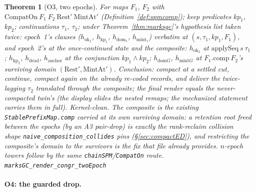 \documentclass[11pt]{article}
\newtheorem{theorem}{Theorem}[section]
\newcommand{\lean}[1]{\texttt{#1}}
\begin{document}
\begin{theorem}[O3, two epochs]
\label{thm:marksgc2}
For maps $F_1$, $F_2$ with $\mathrm{CompatOn}\ F_1\ F_2\
\mathrm{Rest}'\ \mathrm{MintAt}'$ (Definition~\ref{def:spmcomp});
keep predicates $\mathit{kp}_1$, $\mathit{kp}_2$; continuations
$\tau_1$, $\tau_2$; under Theorem~\ref{thm:marksgc}'s hypothesis
list taken twice: epoch~1's clauses ($h_{\mathrm{ok}_1}$,
$h_{\mathrm{kp}_1}$, $h_{\mathrm{dom}_1}$, $h_{\mathrm{mint}_1}$)
verbatim at $(s, \tau_1, \mathit{kp}_1, F_1)$, and epoch~2's at the
once-continued state and the \emph{composite}: $h_{\mathrm{ok}_2}$
at $\mathrm{applySeq}\ s\ \tau_1$; $h_{\mathrm{kp}_2}$,
$h_{\mathrm{dead}}$, $h_{\mathrm{anchor}}$ at the conjunction
$\mathit{kp}_1 \wedge \mathit{kp}_2$; $h_{\mathrm{dom}G}$,
$h_{\mathrm{mint}G}$ at $F_1.\mathrm{comp}\ F_2$'s surviving domain
$(\mathrm{Rest}', \mathrm{MintAt}')$. Conclusion: compact at a
settled cut, continue, compact again on the already re-coded
records, and deliver the twice-lagging $\tau_2$ translated through
the composite; the final render equals the never-compacted twin's
(the display elides the nested remaps; the mechanized statement
carries them in full). Kernel-clean. The composite is the existing
\lean{StablePrefixMap.comp} carried at its own \emph{surviving}
domain: a retention root freed between the epochs (by an A3
pair-drop) is exactly the rank-reclaim collision shape
\lean{naive\_composition\_collides} pins (\S\ref{sec:compactED}),
and restricting the composite's domain to the survivors is the fix
that file already provides. $n$-epoch towers follow by the same
\lean{chainSPM}/\lean{CompatOn} route.
\hfill\lean{marksGC\_render\_congr\_twoEpoch}
\end{theorem}

\paragraph{O4: the guarded drop.}
\end{document}
